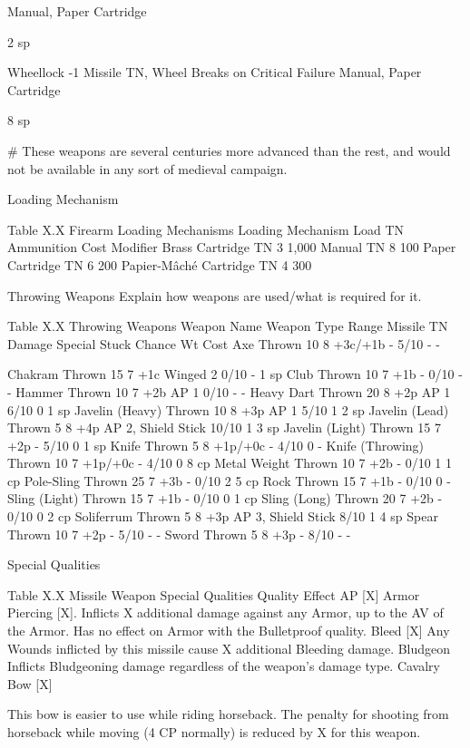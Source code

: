 \documentclass[oneside,11pt,english]{book}
\begin{document}
Manual, Paper 
Cartridge 

2 sp 

Wheellock -1 Missile TN, Wheel Breaks on Critical Failure Manual, Paper 
Cartridge 

8 sp 

\# These weapons are several centuries more advanced than the rest, and would not be available in any sort of medieval campaign. 

 

Loading Mechanism 

 
Table X.X Firearm Loading Mechanisms 
Loading Mechanism Load TN Ammunition Cost Modifier 
Brass Cartridge TN 3 1,000%
Manual TN 8 100%
Paper Cartridge TN 6 200%
Papier-Mâché Cartridge TN 4 300%

 

Throwing Weapons 
Explain how weapons are used/what is required for it. 

 
Table X.X Throwing Weapons 
Weapon Name Weapon Type Range Missile TN Damage Special Stuck Chance Wt Cost 
Axe Thrown 10 8 +3c/+1b - 5/10 - - 


Chakram Thrown 15 7 +1c Winged 2 0/10 - 1 sp 
Club Thrown 10 7 +1b - 0/10 - - 
Hammer Thrown 10 7 +2b AP 1 0/10 - - 
Heavy Dart Thrown 20 8 +2p AP 1 6/10 0 1 sp 
Javelin (Heavy) Thrown 10 8 +3p AP 1 5/10 1 2 sp 
Javelin (Lead) Thrown 5 8 +4p AP 2, Shield Stick 10/10 1 3 sp 
Javelin (Light) Thrown 15 7 +2p - 5/10 0 1 sp 
Knife Thrown 5 8 +1p/+0c - 4/10 0 - 
Knife (Throwing) Thrown 10 7 +1p/+0c - 4/10 0 8 cp 
Metal Weight Thrown 10 7 +2b - 0/10 1 1 cp 
Pole-Sling Thrown 25 7 +3b - 0/10 2 5 cp 
Rock Thrown 15 7 +1b - 0/10 0 - 
Sling (Light) Thrown 15 7 +1b - 0/10 0 1 cp 
Sling (Long) Thrown 20 7 +2b - 0/10 0 2 cp 
Soliferrum Thrown 5 8 +3p AP 3, Shield Stick 8/10 1 4 sp 
Spear Thrown 10 7 +2p - 5/10 - - 
Sword Thrown 5 8 +3p - 8/10 - - 

 

Special Qualities 

 
Table X.X Missile Weapon Special Qualities 
Quality Effect 
AP [X] Armor Piercing [X]. Inflicts X additional damage against any Armor, up to the AV of the Armor. Has 
no effect on Armor with the Bulletproof quality. 
Bleed [X] Any Wounds inflicted by this missile cause X additional Bleeding damage. 
Bludgeon Inflicts Bludgeoning damage regardless of the weapon’s damage type. 
Cavalry 
Bow [X] 

This bow is easier to use while riding horseback. The penalty for shooting from horseback while 
moving (4 CP normally) is reduced by X for this weapon. 
\end{document}
